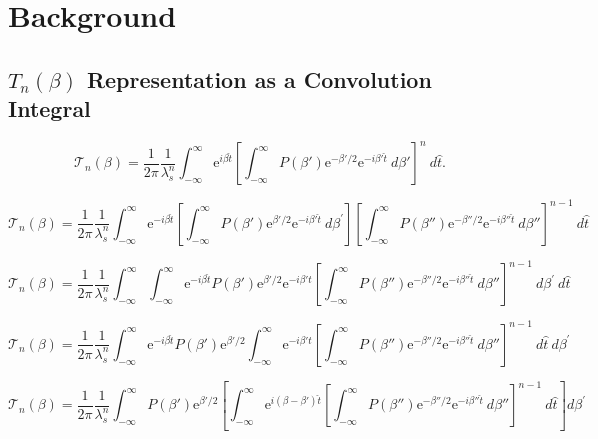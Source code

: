 \documentclass[../master.tex]{subfiles}
\begin{document}
\chapter{Background}
\section{$T_n(\beta)$ Representation as a Convolution Integral}
\label{app:TnConvolutionDeriv}
				\begin{equation}
					\mathcal{T}_n(\beta)=\frac{1}{2\pi}\frac{1}{\lambda_s^n}\int_{-\infty}^{\infty}\mathrm{e}^{i\beta\hat{t}}\left[\int_{-\infty}^{\infty}P(\beta')\mathrm{e}^{-\beta'/2}\mathrm{e}^{-i\beta'\hat{t}}~d\beta'\right]^n~d\hat{t}.
				\end{equation}

				\begin{equation}
					\mathcal{T}_{n}(\beta)=\frac{1}{2\pi}\frac{1}{\lambda_s^n}\int_{-\infty}^{\infty}\mathrm{e}^{-i\beta\hat{t}}\left[\int_{-\infty}^{\infty}P(\beta')\mathrm{e}^{\beta'/2}\mathrm{e}^{-i\beta'\hat{t}}~d\beta^{\prime}\right]\left[\int_{-\infty}^{\infty}P(\beta'')\mathrm{e}^{-\beta''/2}\mathrm{e}^{-i\beta''\hat{t}}~d\beta''\right]^{n-1}~d\hat{t}
				\end{equation}

				\begin{equation}
					\mathcal{T}_{n}(\beta)=\frac{1}{2\pi}\frac{1}{\lambda_s^n}\int_{-\infty}^{\infty}\int_{-\infty}^{\infty}\mathrm{e}^{-i\beta\hat{t}}P(\beta')\mathrm{e}^{\beta'/2}\mathrm{e}^{-i\beta'\hat{t}}\left[\int_{-\infty}^{\infty}P(\beta'')\mathrm{e}^{-\beta''/2}\mathrm{e}^{-i\beta''\hat{t}}~d\beta''\right]^{n-1}~d\beta^{\prime}~d\hat{t}
				\end{equation}

				\begin{equation}
					\mathcal{T}_{n}(\beta)=\frac{1}{2\pi}\frac{1}{\lambda_s^n}\int_{-\infty}^{\infty}\mathrm{e}^{-i\beta\hat{t}}P(\beta')\mathrm{e}^{\beta'/2}\int_{-\infty}^{\infty}\mathrm{e}^{-i\beta'\hat{t}}\left[\int_{-\infty}^{\infty}P(\beta'')\mathrm{e}^{-\beta''/2}\mathrm{e}^{-i\beta''\hat{t}}~d\beta''\right]^{n-1}~d\hat{t}~d\beta^{\prime}
				\end{equation}

				\begin{equation}
					\mathcal{T}_{n}(\beta)=\frac{1}{2\pi}\frac{1}{\lambda_s^n}\int_{-\infty}^{\infty}P(\beta')\mathrm{e}^{\beta'/2}\left[\int_{-\infty}^{\infty}\mathrm{e}^{i(\beta-\beta')\hat{t}}\left[\int_{-\infty}^{\infty}P(\beta'')\mathrm{e}^{-\beta''/2}\mathrm{e}^{-i\beta''\hat{t}}~d\beta''\right]^{n-1}~d\hat{t}\right]d\beta^{\prime}
				\end{equation}
\end{document}

